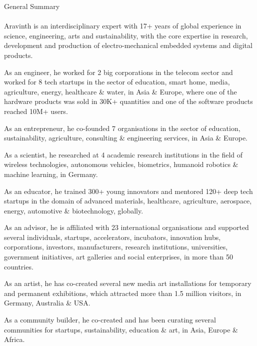 \clearpage
\pagebreak
{
	\centering
	\Huge General Summary
	\par
}

\paragraph{}
\Large
Aravinth is an interdisciplinary expert with 17+ years of global experience in science, engineering, arts and sustainability, with the core expertise in research, development and production of electro-mechanical embedded systems and digital products.

As an engineer, he worked for 2 big corporations in the telecom sector and worked for 8 tech startups in the sector of education, smart home, media, agriculture, energy, healthcare \& water, in Asia \& Europe, where one of the hardware products was sold in 30K+ quantities and one of the software products reached 10M+ users.

As an entrepreneur, he co-founded 7 organisations in the sector of education, sustainability, agriculture, consulting \& engineering services, in Asia \& Europe.

As a scientist, he researched at 4 academic research institutions in the field of wireless technologies, autonomous vehicles, biometrics, humanoid robotics \& machine learning, in Germany.

As an educator, he trained 300+ young innovators and mentored 120+ deep tech startups in the domain of advanced materials, healthcare, agriculture, aerospace, energy, automotive \& biotechnology, globally.

As an advisor, he is affiliated with 23 international organisations and supported several individuals, startups, accelerators, incubators, innovation hubs, corporations, investors, manufacturers, research institutions, universities, government initiatives, art galleries and social enterprises, in more than 50 countries.

As an artist, he has co-created several new media art installations for temporary and permanent exhibitions, which attracted more than 1.5 million visitors, in Germany, Australia \& USA.

As a community builder, he co-created and has been curating several communities for startups, sustainability, education \& art, in Asia, Europe \& Africa.

\clearpage
